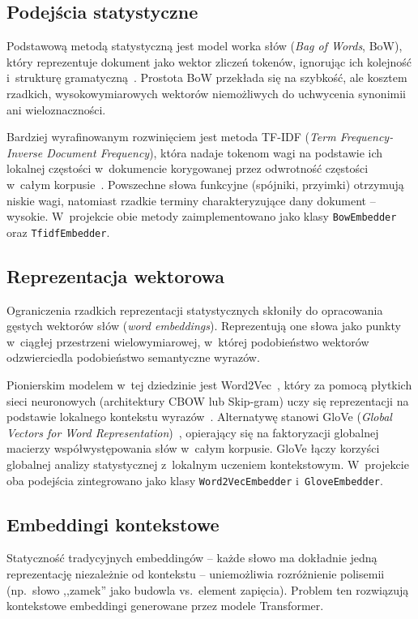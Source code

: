 \documentclass[oneside,polski,logo]{amuthesis}
\begin{document}
\subsection{Podejścia statystyczne}

Podstawową metodą statystyczną jest model worka słów (\textit{Bag of Words}, BoW), który reprezentuje dokument jako wektor zliczeń tokenów, ignorując ich kolejność i~strukturę gramatyczną~\cite{8950616}. Prostota BoW przekłada się na szybkość, ale kosztem rzadkich, wysokowymiarowych wektorów niemożliwych do uchwycenia synonimii ani wieloznaczności.

Bardziej wyrafinowanym rozwinięciem jest metoda TF-IDF (\textit{Term Frequency-Inverse Document Frequency}), która nadaje tokenom wagi na podstawie ich lokalnej częstości w~dokumencie korygowanej przez odwrotność częstości w~całym korpusie~\cite{AIZAWA200345}. Powszechne słowa funkcyjne (spójniki, przyimki) otrzymują niskie wagi, natomiast rzadkie terminy charakteryzujące dany dokument -- wysokie. W~projekcie obie metody zaimplementowano jako klasy \texttt{BowEmbedder} oraz \texttt{TfidfEmbedder}.

\subsection{Reprezentacja wektorowa}
Ograniczenia rzadkich reprezentacji statystycznych skłoniły do opracowania gęstych wektorów słów (\textit{word embeddings}). Reprezentują one słowa jako punkty w~ciągłej przestrzeni wielowymiarowej, w~której podobieństwo wektorów odzwierciedla podobieństwo semantyczne wyrazów.

Pionierskim modelem w~tej dziedzinie jest Word2Vec~\cite{mikolov2013efficient}, który za pomocą płytkich sieci neuronowych (architektury CBOW lub Skip-gram) uczy się reprezentacji na podstawie lokalnego kontekstu wyrazów~\cite{CHURCH_2017}. Alternatywę stanowi GloVe (\textit{Global Vectors for Word Representation})~\cite{pennington2014glove}, opierający się na faktoryzacji globalnej macierzy współwystępowania słów w~całym korpusie. GloVe łączy korzyści globalnej analizy statystycznej z~lokalnym uczeniem kontekstowym. W~projekcie oba podejścia zintegrowano jako klasy \texttt{Word2VecEmbedder} i~\texttt{GloveEmbedder}.

\subsection{Embeddingi kontekstowe}
\label{sec:embeddingi_kontekstowe}
Statyczność tradycyjnych embeddingów -- każde słowo ma dokładnie jedną reprezentację niezależnie od kontekstu -- uniemożliwia rozróżnienie polisemii (np.\ słowo ,,zamek'' jako budowla vs.\ element zapięcia). Problem ten rozwiązują kontekstowe embeddingi generowane przez modele Transformer.
\end{document}
